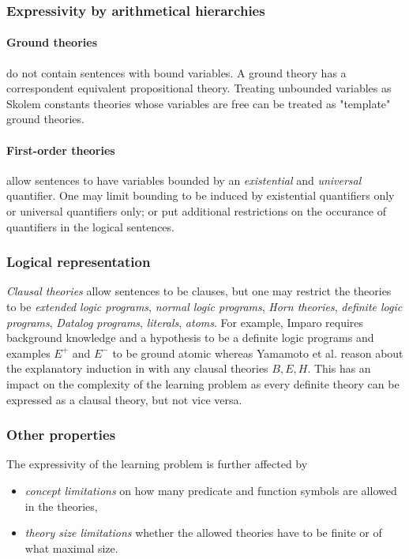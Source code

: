 \subsubsection{Expressivity by arithmetical hierarchies}
\paragraph{Ground theories} do not contain sentences with bound variables. A ground theory has a correspondent equivalent propositional theory. Treating unbounded variables as Skolem constants theories whose variables are free can be treated as "template" ground theories.
\paragraph{First-order theories} allow sentences to have variables bounded by an \emph{existential} and \emph{universal} quantifier. One may limit bounding to be induced by existential quantifiers only or universal quantifiers only; or put additional restrictions on the occurance of quantifiers in the logical sentences.

\subsubsection{Logical representation}
\emph{Clausal theories} allow sentences to be clauses, but one may restrict the theories to be \emph{extended logic programs}, \emph{normal logic programs}, 
\emph{Horn theories}, \emph{definite logic programs}, \emph{Datalog programs}, \emph{literals}, \emph{atoms}. For example, Imparo\cite{kimber2012learning} requires background knowledge and a hypothesis to be a definite logic programs and examples $E^{+}$ and $E^{-}$ to be ground atomic whereas Yamamoto et al. reason about the explanatory induction in \cite{yamamoto2012inverse} with any clausal theories $B, E, H$. This has an impact on the complexity of the learning problem as every definite theory can be expressed as a clausal theory, but not vice versa.

\subsubsection{Other properties}
The expressivity of the learning problem is further affected by
\begin{itemize}
\item \emph{concept limitations} on how many predicate and function symbols are allowed in the theories,
\item \emph{theory size limitations} whether the allowed theories have to be finite or of what maximal size. 
\end{itemize}

